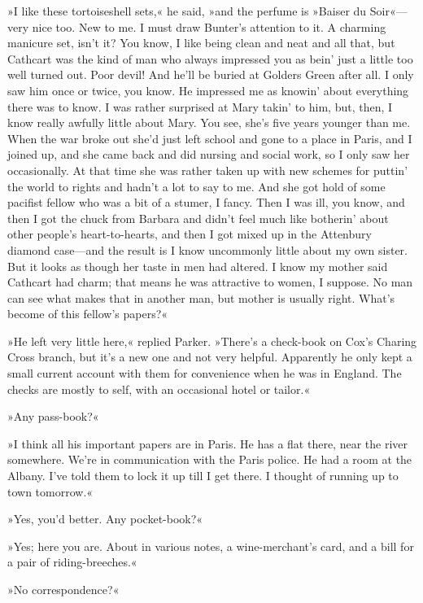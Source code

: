 »I like these tortoiseshell sets,« he said, »and the perfume is »Baiser du Soir«---very nice too. New to me. I must draw Bunter's attention to it. A charming manicure set, isn't it? You know, I like being clean and neat and all that, but Cathcart was the kind of man who always impressed you as bein' just a little too well turned out. Poor devil! And he'll be buried at Golders Green after all. I only saw him once or twice, you know. He impressed me as knowin' about everything there was to know. I was rather surprised at Mary takin' to him, but, then, I know really awfully little about Mary. You see, she's five years younger than me. When the war broke out she'd just left school and gone to a place in Paris, and I joined up, and she came back and did nursing and social work, so I only saw her occasionally. At that time she was rather taken up with new schemes for puttin' the world to rights and hadn't a lot to say to me. And she got hold of some pacifist fellow who was a bit of a stumer, I fancy. Then I was ill, you know, and then I got the chuck from Barbara and didn't feel much like botherin' about other people's heart-to-hearts, and then I got mixed up in the Attenbury diamond case\allowbreak---\allowbreak and the result is I know uncommonly little about my own sister. But it looks as though her taste in men had altered. I know my mother said Cathcart had charm; that means he was attractive to women, I suppose. No man can see what makes that in another man, but mother is usually right. What's become of this fellow's papers?«

»He left very little here,« replied Parker. »There's a check-book on Cox's Charing Cross branch, but it's a new one and not very helpful. Apparently he only kept a small current account with them for convenience when he was in England. The checks are mostly to self, with an occasional hotel or tailor.«

»Any pass-book?«

»I think all his important papers are in Paris. He has a flat there, near the river somewhere. We're in communication with the Paris police. He had a room at the Albany. I've told them to lock it up till I get there. I thought of running up to town tomorrow.«

»Yes, you'd better. Any pocket-book?«

»Yes; here you are. About  in various notes, a wine-merchant's card, and a bill for a pair of riding-breeches.«

»No correspondence?«

